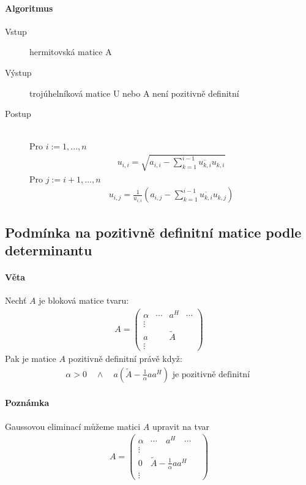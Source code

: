 \documentclass[a4paper,10pt]{article}
\begin{document}
\paragraph{Algoritmus}
\begin{description}
	\item[Vstup] hermitovská matice A
	\item[Výstup] trojúhelníková matice U nebo A není pozitivně definitní
	\item[Postup] \ \\
	Pro $i := 1, ..., n$
	\begin{align}
		u_{i,i} = \sqrt{ a_{i,i} - \sum_{k=1}^{i-1} \overline{u_{k,i}} u_{k,i}}
	\end{align}
	Pro $j := i+1, ..., n$
	\begin{align}
		u_{i,j} = \frac{1}{u_{i,i}} \left( a_{i,j} - \sum_{k=1}^{i-1}
		\overline{u_{k,i}} u_{k,j} \right)
	\end{align}
\end{description}

\subsection{Podmínka na pozitivně definitní matice podle determinantu}
\setcounter{equation}{0}
\paragraph{Věta}
Nechť $A$ je bloková matice tvaru:
\begin{align*}
	A=\left(
	\begin{matrix}
	\alpha & \cdots & a^H & \cdots \\
	\vdots & && \\
	a & & \tilde{A} & \\
	\vdots &&&
	\end{matrix}
	\right)
\end{align*}
Pak je matice $A$ pozitivně definitní právě když:
\begin{align*}
	\alpha > 0 \quad \land \quad a \left( \tilde{A} - \frac{1}{\alpha} a a^H
	\right) \text{ je pozitivně definitní }
\end{align*}
\paragraph{Poznámka}
Gaussovou eliminací můžeme matici $A$ upravit na tvar
\begin{align*}
	A=\left(
	\begin{matrix}
	\alpha & \cdots \quad a^H \quad  \cdots \\
	\vdots & & \\
	0 &  \tilde{A} - \frac{1}{\alpha} a a^H \\
	\vdots &
	\end{matrix}
	\right)
\end{align*}
\end{document}
